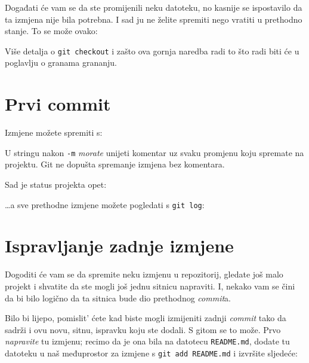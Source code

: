 
Događati će vam se da ste promijenili neku datoteku, no kasnije se ispostavilo da ta izmjena nije bila potrebna. 
I sad ju ne želite spremiti nego vratiti u prethodno stanje.
To se može ovako:


Više detalja o \verb+git checkout+ i zašto ova gornja naredba radi to što radi biti će u poglavlju o granama grananju.

\section*{Prvi commit}

Izmjene možete spremiti s:


U stringu nakon \verb+-m+ \emph{morate} unijeti komentar uz svaku promjenu koju spremate na projektu.
Git ne dopušta spremanje izmjena bez komentara.

Sad je status projekta opet:



\dots{}a sve prethodne izmjene možete pogledati s \verb+git log+:



\section*{Ispravljanje zadnje izmjene}

Dogoditi će vam se da spremite neku izmjenu u repozitorij, gledate još malo projekt i shvatite da ste mogli još jednu sitnicu napraviti.
I, nekako vam se čini da bi bilo logično da ta sitnica bude dio prethodnog \emph{commit}a.

Bilo bi lijepo, pomislit' ćete kad biste mogli izmijeniti zadnji \emph{commit} tako da sadrži i ovu novu, sitnu, ispravku koju ste dodali.
S gitom se to može.
Prvo \emph{napravite} tu izmjenu; recimo da je ona bila na datotecu \verb+README.md+, dodate tu datoteku u naš međuprostor za izmjene s \verb+git add README.md+ i izvršite sljedeće:



